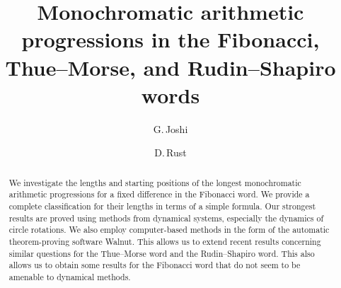 \documentclass[10pt,a4paper,reqno]{amsart}
\newcommand{\walnut}{{\ttfamily Walnut}}
\begin{document}
\theoremstyle{definition}

\newtheorem{theorem}{Theorem}[section]
\newtheorem{definition}[theorem]{Definition}
\newtheorem{cor}[theorem]{Corollary}
\newtheorem{prop}[theorem]{Proposition}
\newtheorem{lem}[theorem]{Lemma}
\newtheorem{example}[theorem]{Example}
\newtheorem{que}[theorem]{Question}
\newtheorem{conj}[theorem]{Conjecture}
\theoremstyle{remark}
\newtheorem{rem}[theorem]{Remark}







\title{Monochromatic arithmetic progressions in the {F}ibonacci, {T}hue--{M}orse, and {R}udin--{S}hapiro words}
 
\author[G.\,Joshi]{G.\,Joshi}
\author[D.\,Rust]{D.\,Rust}


\address[G.\,Joshi]{School of Mathematics and Statistics, The Open University, Milton Keynes, MK7 6AA, UK}
\address[D.\,Rust]{School of Mathematics and Statistics, The Open University, Milton Keynes, MK7 6AA, UK}








\begin{abstract}
We investigate the lengths and starting positions of the longest monochromatic arithmetic progressions for a fixed difference in the Fibonacci word. We provide a complete classification for their lengths in terms of a simple formula. Our strongest results are proved using methods from dynamical systems, especially the dynamics of circle rotations. We also employ computer-based methods in the form of the automatic theorem-proving software \walnut{}. This allows us to extend recent results concerning similar questions for the Thue--Morse word and the Rudin--Shapiro word. This also allows us to obtain some results for the Fibonacci word that do not seem to be amenable to dynamical methods.
\end{abstract}

\maketitle
\end{document}

